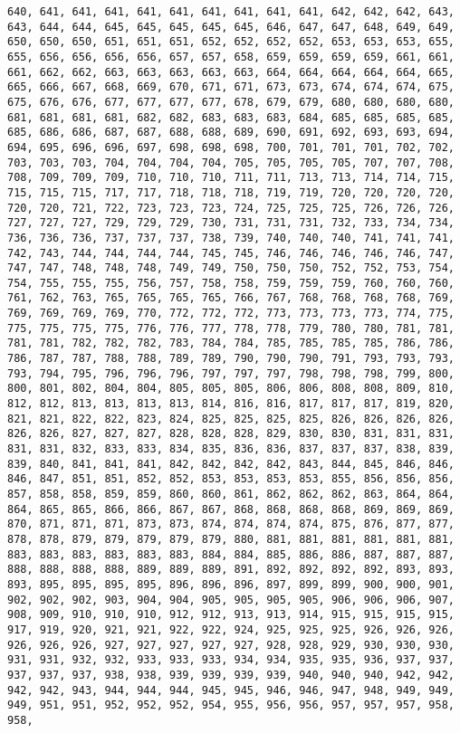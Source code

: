 \documentclass[11pt]{article}
\begin{document}
\begin{Verbatim}[commandchars=\\\{\}]
640, 641, 641, 641, 641, 641, 641, 641, 641, 641, 642, 642, 642, 643, 643, 644, 644, 645, 645, 645, 645, 645, 646, 647, 647, 648, 649, 649, 650, 650, 650, 651, 651, 651, 652, 652, 652, 652, 653, 653, 653, 655, 655, 656, 656, 656, 656, 657, 657, 658, 659, 659, 659, 659, 661, 661, 661, 662, 662, 663, 663, 663, 663, 663, 664, 664, 664, 664, 664, 665, 665, 666, 667, 668, 669, 670, 671, 671, 673, 673, 674, 674, 674, 675, 675, 676, 676, 677, 677, 677, 677, 678, 679, 679, 680, 680, 680, 680, 681, 681, 681, 681, 682, 682, 683, 683, 683, 684, 685, 685, 685, 685, 685, 686, 686, 687, 687, 688, 688, 689, 690, 691, 692, 693, 693, 694, 694, 695, 696, 696, 697, 698, 698, 698, 700, 701, 701, 701, 702, 702, 703, 703, 703, 704, 704, 704, 704, 705, 705, 705, 705, 707, 707, 708, 708, 709, 709, 709, 710, 710, 710, 711, 711, 713, 713, 714, 714, 715, 715, 715, 715, 717, 717, 718, 718, 718, 719, 719, 720, 720, 720, 720, 720, 720, 721, 722, 723, 723, 723, 724, 725, 725, 725, 726, 726, 726, 727, 727, 727, 729, 729, 729, 730, 731, 731, 731, 732, 733, 734, 734, 736, 736, 736, 737, 737, 737, 738, 739, 740, 740, 740, 741, 741, 741, 742, 743, 744, 744, 744, 744, 745, 745, 746, 746, 746, 746, 746, 747, 747, 747, 748, 748, 748, 749, 749, 750, 750, 750, 752, 752, 753, 754, 754, 755, 755, 755, 756, 757, 758, 758, 759, 759, 759, 760, 760, 760, 761, 762, 763, 765, 765, 765, 765, 766, 767, 768, 768, 768, 768, 769, 769, 769, 769, 769, 770, 772, 772, 772, 773, 773, 773, 773, 774, 775, 775, 775, 775, 775, 776, 776, 777, 778, 778, 779, 780, 780, 781, 781, 781, 781, 782, 782, 782, 783, 784, 784, 785, 785, 785, 785, 786, 786, 786, 787, 787, 788, 788, 789, 789, 790, 790, 790, 791, 793, 793, 793, 793, 794, 795, 796, 796, 796, 797, 797, 797, 798, 798, 798, 799, 800, 800, 801, 802, 804, 804, 805, 805, 805, 806, 806, 808, 808, 809, 810, 812, 812, 813, 813, 813, 813, 814, 816, 816, 817, 817, 817, 819, 820, 821, 821, 822, 822, 823, 824, 825, 825, 825, 825, 826, 826, 826, 826, 826, 826, 827, 827, 827, 828, 828, 828, 829, 830, 830, 831, 831, 831, 831, 831, 832, 833, 833, 834, 835, 836, 836, 837, 837, 837, 838, 839, 839, 840, 841, 841, 841, 842, 842, 842, 842, 843, 844, 845, 846, 846, 846, 847, 851, 851, 852, 852, 853, 853, 853, 853, 855, 856, 856, 856, 857, 858, 858, 859, 859, 860, 860, 861, 862, 862, 862, 863, 864, 864, 864, 865, 865, 866, 866, 867, 867, 868, 868, 868, 868, 869, 869, 869, 870, 871, 871, 871, 873, 873, 874, 874, 874, 874, 875, 876, 877, 877, 878, 878, 879, 879, 879, 879, 879, 880, 881, 881, 881, 881, 881, 881, 883, 883, 883, 883, 883, 883, 884, 884, 885, 886, 886, 887, 887, 887, 888, 888, 888, 888, 889, 889, 889, 891, 892, 892, 892, 892, 893, 893, 893, 895, 895, 895, 895, 896, 896, 896, 897, 899, 899, 900, 900, 901, 902, 902, 902, 903, 904, 904, 905, 905, 905, 905, 906, 906, 906, 907, 908, 909, 910, 910, 910, 912, 912, 913, 913, 914, 915, 915, 915, 915, 917, 919, 920, 921, 921, 922, 922, 924, 925, 925, 925, 926, 926, 926, 926, 926, 926, 927, 927, 927, 927, 927, 928, 928, 929, 930, 930, 930, 931, 931, 932, 932, 933, 933, 933, 934, 934, 935, 935, 936, 937, 937, 937, 937, 937, 938, 938, 939, 939, 939, 939, 940, 940, 940, 942, 942, 942, 942, 943, 944, 944, 944, 945, 945, 946, 946, 947, 948, 949, 949, 949, 951, 951, 952, 952, 952, 954, 955, 956, 956, 957, 957, 957, 958, 958, 
\end{Verbatim}
\end{document}
